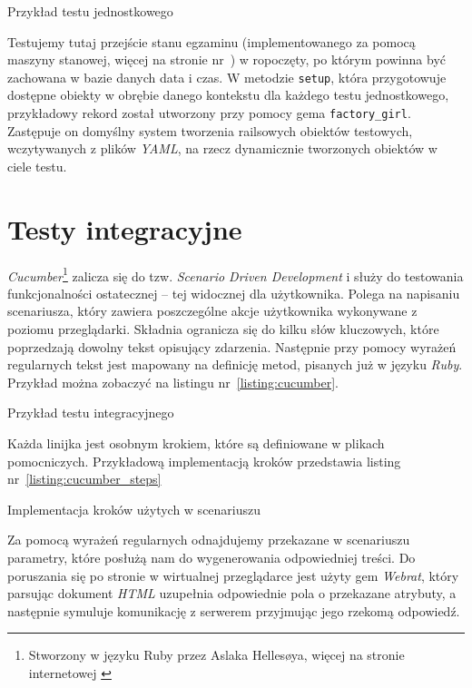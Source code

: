 \documentclass[12pt,twoside]{report}
\begin{document}
\begin{listing}
  
  \caption{Przykład testu jednostkowego}
  \label{listing:shoulda}
\end{listing}


Testujemy tutaj przejście stanu egzaminu (implementowanego za pomocą maszyny stanowej,
więcej na stronie nr~\pageref{sec:state_machine}) w ropoczęty, po którym powinna być
zachowana w bazie danych data i czas. W metodzie \texttt{setup}, która przygotowuje
dostępne obiekty w obrębie danego kontekstu dla każdego testu jednostkowego, przykładowy
rekord został utworzony przy pomocy gema \texttt{factory\_girl}. Zastępuje on domyślny
system tworzenia railsowych obiektów testowych, wczytywanych z plików \emph{YAML}, na
rzecz dynamicznie tworzonych obiektów w ciele testu.

\section{Testy integracyjne}
\emph{Cucumber}\footnote{Stworzony w języku Ruby przez Aslaka Hellesøya, więcej na stronie
internetowej \cite{cucumber}} zalicza się do tzw. \emph{Scenario Driven Development} i
służy do testowania funkcjonalności ostatecznej -- tej widocznej dla użytkownika. Polega
na napisaniu scenariusza, który zawiera poszczególne akcje użytkownika wykonywane z
poziomu przeglądarki. Składnia ogranicza się do kilku słów kluczowych, które poprzedzają
dowolny tekst opisujący zdarzenia. Następnie przy pomocy wyrażeń regularnych tekst jest
mapowany na definicję metod, pisanych już w języku \emph {Ruby}. Przykład można zobaczyć
na listingu nr~\ref{listing:cucumber}.

\begin{listing}
  
  \caption{Przykład testu integracyjnego}
  \label{listing:cucumber}
\end{listing}


Każda linijka jest osobnym krokiem, które są definiowane w plikach pomocniczych.
Przykładową implementacją kroków przedstawia listing nr~\ref{listing:cucumber_steps}

\begin{listing}
  
  \caption{Implementacja kroków użytych w scenariuszu}
  \label{listing:cucumber_steps}
\end{listing}


Za pomocą wyrażeń regularnych odnajdujemy przekazane w scenariuszu parametry, które
posłużą nam do wygenerowania odpowiedniej treści. Do poruszania się po stronie w
wirtualnej przeglądarce jest użyty gem \emph{Webrat}, który parsując dokument
\emph{HTML} uzupełnia odpowiednie pola o przekazane atrybuty, a następnie symuluje
komunikację z serwerem przyjmując jego rzekomą odpowiedź.
\end{document}
